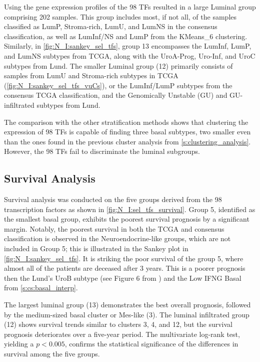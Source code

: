 Using the gene expression profiles of the 98 TFs resulted in a large Luminal group comprising 202 samples. This group includes most, if not all, of the samples classified as LumP, Stroma-rich, LumU, and LumNS in the consensus classification, as well as LumInf/NS and LumP from the KMeans\_6 clustering. Similarly, in \cref{fig:N_I:sankey_sel_tfs}, group 13 encompasses the LumInf, LumP, and LumNS subtypes from TCGA, along with the UroA-Prog, Uro-Inf, and UroC subtypes from Lund. The smaller Luminal group (12) primarily consists of samples from LumU and Stroma-rich subtypes in TCGA (\cref{fig:N_I:sankey_sel_tfs_vuCs}), or the LumInf/LumP subtypes from the consensus TCGA classification, and the Genomically Unstable (GU) and GU-infiltrated subtypes from Lund.


The comparison with the other stratification methods shows that clustering the expression of 98 TFs is capable of finding three basal subtypes, two smaller even than the ones found in the previous cluster analysis from \cref{s:clustering_analysis}. However, the 98 TFs fail to discriminate the luminal subgroups.

\subsection{Survival Analysis}

Survival analysis was conducted on the five groups derived from the 98 transcription factors as shown in \cref{fig:N_I:sel_tfs_survival}. Group 5, identified as the smallest basal group, exhibits the poorest survival prognosis by a significant margin. Notably, the poorest survival in both the TCGA and consensus classification is observed in the Neuroendocrine-like groups, which are not included in Group 5; this is illustrated in the Sankey plot in \cref{fig:N_I:sankey_sel_tfs}. It is striking the poor survival of the group 5, where almost all of the patients are deceased after 3 years. This is a poorer prognosis then the Lund's UroB subtype (see Figure 6 from \citet{Marzouka2018-ge}) and the Low IFNG Basal from \cref{s:cs:basal_interp}.

The largest luminal group (13) demonstrates the best overall prognosis, followed by the medium-sized basal cluster or Mes-like (3). The luminal infiltrated group (12) shows survival trends similar to clusters 3, 4, and 12, but the survival prognosis deteriorates over a five-year period. The multivariate log-rank test, yielding a $p<0.005$, confirms the statistical significance of the differences in survival among the five groups.


